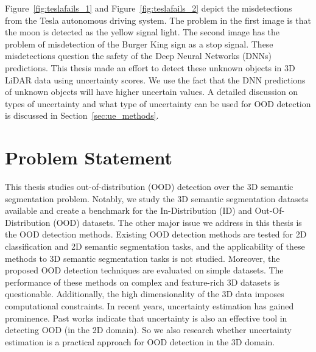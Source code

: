 Figure~\ref{fig:teslafails_1} and Figure~\ref{fig:teslafails_2} depict the misdetections from the Tesla autonomous driving system.
The problem in the first image is that the moon is detected as the yellow signal light.
The second image has the problem of misdetection of the Burger King sign as a stop signal. 
These misdetections question the safety of the Deep Neural Networks (DNNs) predictions.
This thesis made an effort to detect these unknown objects in 3D LiDAR data using uncertainty scores.
We use the fact that the DNN predictions of unknown objects will have higher uncertain values.
A detailed discussion on types of uncertainty and what type of uncertainty can be used for OOD detection is discussed in Section~\ref{sec:ue_methods}.


\section{Problem Statement}
This thesis studies out-of-distribution (OOD) detection over the 3D semantic
segmentation problem. Notably, we study the 3D semantic segmentation datasets available and create a
benchmark for the In-Distribution (ID) and Out-Of-Distribution (OOD) datasets.
The other major issue we address in this thesis is the OOD detection methods. Existing OOD detection
methods are tested for 2D classification and 2D semantic segmentation tasks, and the applicability of
these methods to 3D semantic segmentation tasks is not studied. Moreover, the proposed OOD detection
techniques are evaluated on simple datasets. The performance of these methods on complex and
feature-rich 3D datasets is questionable. Additionally, the high dimensionality of the 3D data imposes computational constraints. In recent years, uncertainty estimation has gained prominence. Past works
indicate that uncertainty is also an effective tool in detecting OOD (in the 2D domain). So we also research
whether uncertainty estimation is a practical approach for OOD detection in the 3D domain.
% 

